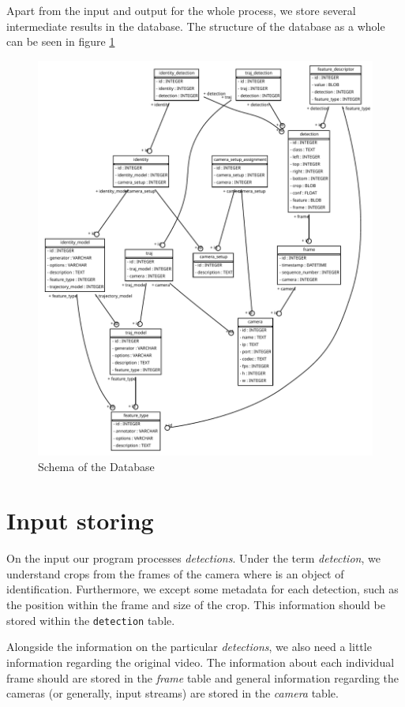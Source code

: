 Apart from the input and output for the whole process, we store several intermediate results in the database. The structure
of the database as a whole can be seen in figure \ref{fig:db_structure}

\begin{figure}
    \centering
    \includegraphics[width=\textwidth]{../img/database_schema.pdf}
    \caption{Schema of the Database}
    \label{fig:db_structure}
\end{figure}

\section{Input storing}

On the input our program processes \emph{detections}. Under the term \emph{detection}, we understand crops from
the frames of the camera where is an object of identification. Furthermore, we except some metadata for each
detection, such as the position within the frame and size of the crop. This information should be stored within
the \texttt{detection} table.

Alongside the information on the particular \emph{detections}, we also need a little information regarding the
original video. The information about each individual frame should are stored in the \emph{frame} table and general
information regarding the cameras (or generally, input streams) are stored in the \emph{camera} table.

